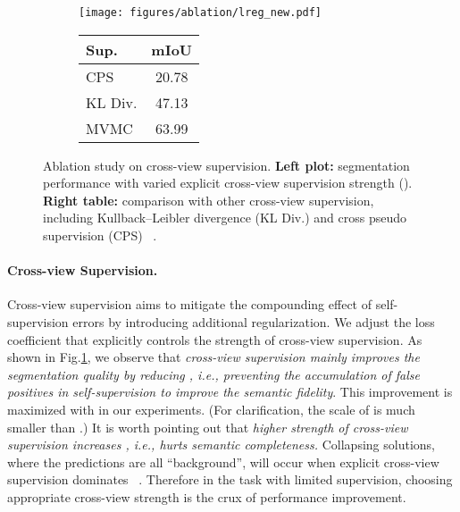 \documentclass[twocolumn]{svjour3}          \smartqed  \usepackage{graphicx}
\makeatletter
\newcommand{\Fig}{Fig.\@\xspace}
\newcommand{\prelim}[1]{{#1}}
\makeatother
\begin{document}
 \begin{figure}[t!]
    \centering
    \begin{subfigure}{0.6\linewidth}
      \texttt{[image: figures/ablation/lreg\_new.pdf]}
\end{subfigure}
    \begin{subfigure}{0.38\linewidth}
\centering
        \begin{tabular}{l | c}
Sup.  & mIoU \\
            \midrule
            CPS & 20.78 \\
            KL Div. & 47.13 \\
\midrule
            MVMC & 63.99 \\
\end{tabular}
\end{subfigure}
    \caption{
        \prelim{
        Ablation study on cross-view supervision. \textbf{Left plot:} segmentation performance with varied explicit cross-view supervision strength (). \textbf{Right table:} comparison with other cross-view supervision, including Kullback–Leibler divergence (KL Div.) and cross pseudo supervision (CPS) ~\citep{Chen2021:CrossPseudo}.
        }
    }
    \label{fig:ablation_mvmc}
\end{figure}

\paragraph{Cross-view Supervision.}
Cross-view supervision aims to mitigate the compounding effect of self-supervision errors by introducing additional regularization.
We adjust the loss coefficient  that explicitly controls the strength of cross-view supervision.
As shown in \Fig\ref{fig:ablation_mvmc}, we observe that \textit{cross-view supervision mainly improves the segmentation quality by reducing , \textit{i.e.}, preventing the accumulation of false positives in self-supervision to improve the semantic fidelity}.
This improvement is maximized with  in our experiments. (For clarification, the scale of   is much smaller than  .)
It is worth pointing out that \textit{higher strength of cross-view supervision increases , \textit{i.e.}, hurts semantic completeness.}
Collapsing solutions, where the predictions are all ``background'', will occur when explicit cross-view supervision dominates ~\citep{Xinlei:SimSiam,CaronMMGBJ20:SWaV}.
Therefore in the task with limited supervision, choosing appropriate cross-view strength is the crux of performance improvement.
\end{document}
